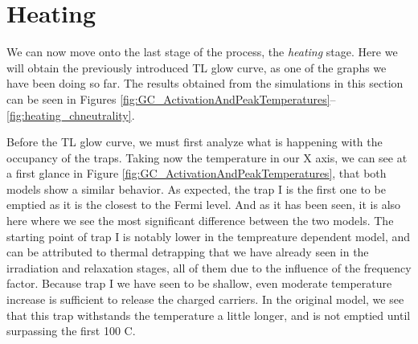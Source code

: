 \vspace{10pt}

\section{Heating}\label{sec:heating}

We can now move onto the last stage of the process, the \textit{heating} stage. Here we will obtain the previously introduced TL glow curve, as one of the graphs we have been doing so far. The results obtained from the simulations in this section can be seen in Figures \ref{fig:GC_ActivationAndPeakTemperatures}--\ref{fig:heating_chneutrality}. 

\vspace{10pt}
Before the TL glow curve, we must first analyze what is happening with the occupancy of the traps. Taking now the temperature in our X axis, we can see at a first glance in Figure \ref{fig:GC_ActivationAndPeakTemperatures}, that both models show a similar behavior. As expected, the trap I is the first one to be emptied as it is the closest to the Fermi level. And as it has been seen, it is also here where we see the most significant difference between the two models. The starting point of trap I is notably lower in the tempreature dependent model, and can be attributed to thermal detrapping that we have already seen in the irradiation and relaxation stages, all of them due to the influence of the frequency factor. Because trap I we have seen to be shallow, even moderate temperature increase is sufficient to release the charged carriers. In the original model, we see that this trap withstands the temperature a little longer, and is not emptied until surpassing the first 100 \textdegree C. 

\vspace{10pt}

